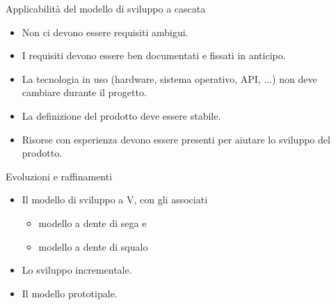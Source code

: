 \documentclass{beamer}
\begin{document}
\begin{frame}{\centerline{Applicabilit\`{a} del modello di sviluppo a cascata}}


\begin{itemize}

\item  Non ci devono essere requisiti ambigui.

\item  I requisiti devono essere ben documentati e fissati in anticipo.

\item  La tecnologia in uso (hardware, sistema operativo, API, ...) non deve cambiare durante il progetto.

\item  La definizione del prodotto deve essere stabile.

\item  Risorse con esperienza devono essere presenti per aiutare lo sviluppo del prodotto.
\end{itemize}

\end{frame}

\begin{frame}{\centerline{Evoluzioni e raffinamenti}}


\begin{itemize}

\item  Il modello di sviluppo a V, con gli associati
\begin{itemize}
\item modello a dente di sega e 
\item modello a dente di squalo
\end{itemize}

\item  Lo sviluppo incrementale.

\item  Il modello prototipale.

\end{itemize}

\end{frame}
\end{document}
